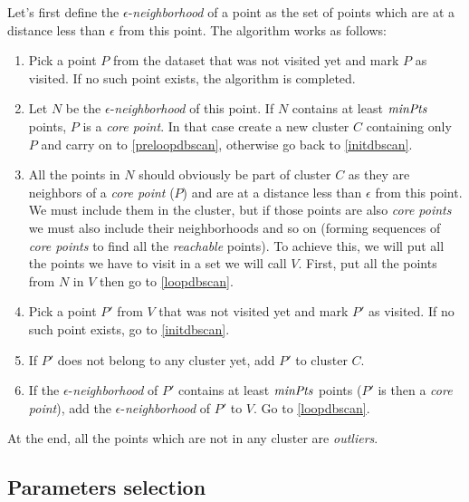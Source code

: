 Let's first define the $\epsilon$-\emph{neighborhood} of a point as the set of points which are at a distance less than $\epsilon$ from this point. The algorithm works as follows\cite{dbscan}:
\begin{enumerate}
	\item \label{initdbscan} Pick a point $P$ from the dataset that was not visited yet and mark $P$ as visited. If no such point exists, the algorithm is completed.
	\item Let $N$ be the $\epsilon$-\emph{neighborhood} of this point. If $N$ contains at least $\mathit{minPts}$ points, $P$ is a \emph{core point}. In that case create a new cluster $C$ containing only $P$ and carry on to \ref{preloopdbscan}, otherwise go back to \ref{initdbscan}.
	\item\label{preloopdbscan} All the points in $N$ should obviously be part of cluster $C$ as they are neighbors of a \emph{core point} ($P$) and are at a distance less than $\epsilon$ from this point. We must include them in the cluster, but if those points are also \emph{core points} we must also include their neighborhoods and so on (forming sequences of \emph{core points} to find all the \emph{reachable} points). To achieve this, we will put all the points we have to visit in a set we will call $V$. First, put all the points from $N$ in $V$ then go to \ref{loopdbscan}.
	\item \label{loopdbscan} Pick a point $P'$ from $V$ that was not visited yet and mark $P'$ as visited. If no such point exists, go to \ref{initdbscan}.
	\item If $P'$ does not belong to any cluster yet, add $P'$ to cluster $C$.
	\item If the $\epsilon$-\emph{neighborhood} of $P'$ contains at least $\mathit{minPts}$ points ($P'$ is then a \emph{core point}), add the $\epsilon$-\emph{neighborhood} of $P'$ to $V$. Go to \ref{loopdbscan}.
\end{enumerate}

At the end, all the points which are not in any cluster are \emph{outliers}.

\subsection{Parameters selection}\label{subsec:paramselect}

